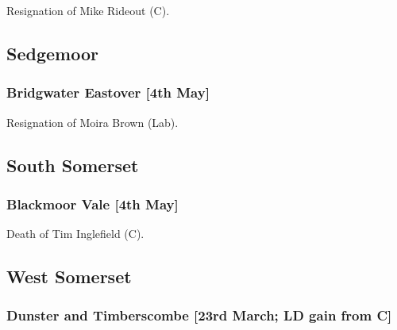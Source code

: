 \documentclass[a4paper,openany]{book}
\begin{document}
\begin{resultsiii}

Resignation of Mike Rideout (C).

\subsection*{Sedgemoor}

\subsubsection*{Bridgwater Eastover \hspace*{\fill}\nolinebreak[1]%
\enspace\hspace*{\fill}
[4th May]}


Resignation of Moira Brown (Lab).

\subsection*{South Somerset}

\subsubsection*{Blackmoor Vale \hspace*{\fill}\nolinebreak[1]%
\enspace\hspace*{\fill}
[4th May]}


Death of Tim Inglefield (C).

\subsection*{West Somerset}

\subsubsection*{Dunster and Timberscombe \hspace*{\fill}\nolinebreak[1]%
\enspace\hspace*{\fill}
[23rd March; LD gain from C]}



\end{resultsiii}
\end{document}
